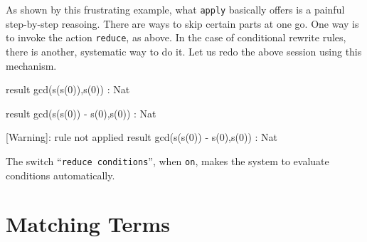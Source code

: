\documentclass[a4paper]{memoir}
\begin{document}
As shown by this frustrating example, what \verb|apply| basically
offers is a painful step-by-step reasoing. There are ways to skip
certain parts at one go. One way is to invoke the action \verb|reduce|,
as above. In the case of conditional rewrite rules, there is another,
systematic way to do it. Let us redo the above session using this
mechanism.
\begin{vvtm}
\begin{ccode}


  result gcd(s(s(0)),s(0)) : Nat

  result gcd(s(s(0)) - s(0),s(0)) : Nat


  [Warning]: rule not applied
  result gcd(s(s(0)) - s(0),s(0)) : Nat

\end{ccode}
\end{vvtm}
The switch ``\verb|reduce conditions|'', when \verb|on|, makes the
system to evaluate conditions automatically.

\section{Matching Terms}\label{sec:p2-matching-terms}
\end{document}
